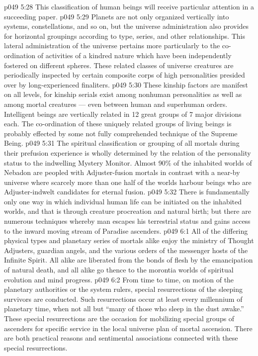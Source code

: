 \vs p049 5:28 This classification of human beings will receive particular attention in a succeeding paper.
\vs p049 5:29 \bibnobreakspace {} Planets are not only organized vertically into systems, constellations, and so on, but the universe administration also provides for horizontal groupings according to type, series, and other relationships. This lateral administration of the universe pertains more particularly to the co\hyp{}ordination of activities of a kindred nature which have been independently fostered on different spheres. These related classes of universe creatures are periodically inspected by certain composite corps of high personalities presided over by long\hyp{}experienced finaliters.
\vs p049 5:30 These kinship factors are manifest on all levels, for kinship serials exist among nonhuman personalities as well as among mortal creatures --- even between human and superhuman orders. Intelligent beings are vertically related in 12 great groups of 7 major divisions each. The co\hyp{}ordination of these uniquely related groups of living beings is probably effected by some not fully comprehended technique of the Supreme Being.
\vs p049 5:31 \bibnobreakspace {} The spiritual classification or grouping of all mortals during their prefusion experience is wholly determined by the relation of the personality status to the indwelling Mystery Monitor. Almost 90\% of the inhabited worlds of Nebadon are peopled with Adjuster\hyp{}fusion mortals in contrast with a near\hyp{}by universe where scarcely more than one half of the worlds harbour beings who are Adjuster\hyp{}indwelt candidates for eternal fusion.
\vs p049 5:32 \bibnobreakspace {} There is fundamentally only one way in which individual human life can be initiated on the inhabited worlds, and that is through creature procreation and natural birth; but there are numerous techniques whereby man escapes his terrestrial status and gains access to the inward moving stream of Paradise ascenders.
\vs p049 6:1 All of the differing physical types and planetary series of mortals alike enjoy the ministry of Thought Adjusters, guardian angels, and the various orders of the messenger hosts of the Infinite Spirit. All alike are liberated from the bonds of flesh by the emancipation of natural death, and all alike go thence to the morontia worlds of spiritual evolution and mind progress.
\vs p049 6:2 From time to time, on motion of the planetary authorities or the system rulers, special resurrections of the sleeping survivors are conducted. Such resurrections occur at least every millennium of planetary time, when not all but “many of those who sleep in the dust awake.” These special resurrections are the occasion for mobilizing special groups of ascenders for specific service in the local universe plan of mortal ascension. There are both practical reasons and sentimental associations connected with these special resurrections.
